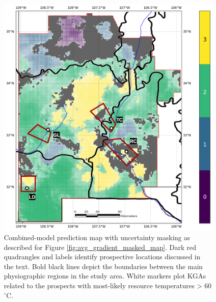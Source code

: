 \begin{figure}
\centering
\includegraphics[width=.75\textwidth]{templates/images/Figure-Masked_Average_Gradient_Map-Prospect_Zones.png}
\caption[Structural uncertainty map with prospective areas]
{Combined-model prediction map with uncertainty masking as described for Figure \ref{fig:avg_gradient_masked_map}. Dark red quadrangles and labels identify prospective locations discussed in the text. Bold black lines depict the boundaries between the main physiographic regions in the study area. White markers plot KGAs related to the prospects with most-likely resource temperatures > 60 $^\circ$C.}
\label{fig:structural_uncertainty_prospects}
\end{figure}


